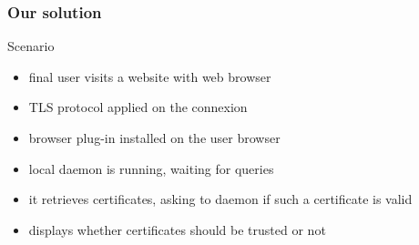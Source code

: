 \begin{frame}
	\frametitle{Our solution}
	\begin{alertblock}{Scenario}
		\begin{itemize}
			\item final user visits a website with web browser
			\item TLS protocol applied on the connexion
			\item browser plug-in installed on the user browser
			\item local daemon is running, waiting for queries
			\item it retrieves certificates, asking to daemon if such a certificate is valid
			\item displays whether certificates should be trusted or not
		\end{itemize}
	\end{alertblock}
\end{frame}